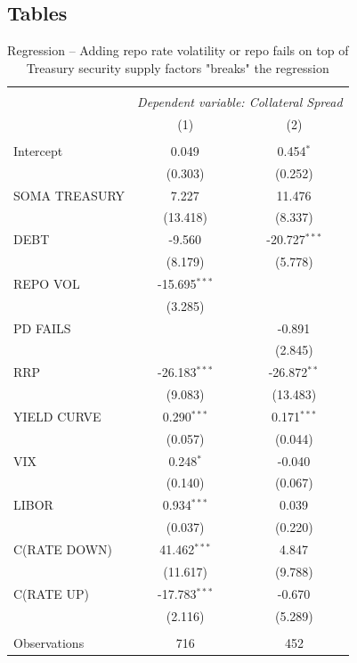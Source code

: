 \documentclass[11pt,a4paper,english,oneside]{article}
\begin{document}
\begin{appendices}
\section{Tables}

\begin{table}[!htbp] \centering
\caption{Regression -- Adding repo rate volatility or repo fails on top of Treasury security supply factors "breaks" the regression}
\begin{tabular}{@{\extracolsep{5pt}}lcc}
\\[-1.8ex]\hline
\hline \\[-1.8ex]
& \multicolumn{2}{c}{\textit{Dependent variable: Collateral Spread}} \
\cr \cline{2-3}
\\[-1.8ex] & (1) & (2) \\
\hline \\[-1.8ex]
 Intercept & 0.049$^{}$ & 0.454$^{*}$ \\
  & (0.303) & (0.252) \\
 SOMA TREASURY & 7.227$^{}$ & 11.476$^{}$ \\
  & (13.418) & (8.337) \\
 DEBT & -9.560$^{}$ & -20.727$^{***}$ \\
  & (8.179) & (5.778) \\
 REPO VOL & -15.695$^{***}$ & \\
  & (3.285) & \\
 PD FAILS & & -0.891$^{}$ \\
  & & (2.845) \\
 RRP & -26.183$^{***}$ & -26.872$^{**}$ \\
  & (9.083) & (13.483) \\
 YIELD CURVE & 0.290$^{***}$ & 0.171$^{***}$ \\
  & (0.057) & (0.044) \\
 VIX & 0.248$^{*}$ & -0.040$^{}$ \\
  & (0.140) & (0.067) \\
 LIBOR & 0.934$^{***}$ & 0.039$^{}$ \\
  & (0.037) & (0.220) \\
 C(RATE DOWN) & 41.462$^{***}$ & 4.847$^{}$ \\
  & (11.617) & (9.788) \\
 C(RATE UP) & -17.783$^{***}$ & -0.670$^{}$ \\
  & (2.116) & (5.289) \\
\hline \\[-1.8ex]
 Observations & 716 & 452 \\

\end{tabular}
\end{table}
\end{appendices}
\end{document}
